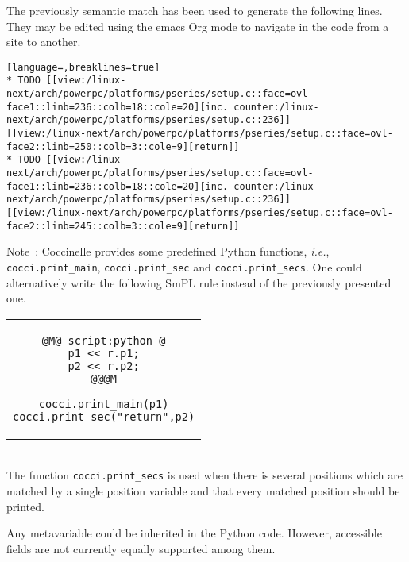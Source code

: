 The previously semantic match has been used to generate the following
lines. They may be edited using the emacs Org mode to navigate in the code
from a site to another.

\begin{lstlisting}[language=,breaklines=true]
* TODO [[view:/linux-next/arch/powerpc/platforms/pseries/setup.c::face=ovl-face1::linb=236::colb=18::cole=20][inc. counter:/linux-next/arch/powerpc/platforms/pseries/setup.c::236]]
[[view:/linux-next/arch/powerpc/platforms/pseries/setup.c::face=ovl-face2::linb=250::colb=3::cole=9][return]]
* TODO [[view:/linux-next/arch/powerpc/platforms/pseries/setup.c::face=ovl-face1::linb=236::colb=18::cole=20][inc. counter:/linux-next/arch/powerpc/platforms/pseries/setup.c::236]]
[[view:/linux-next/arch/powerpc/platforms/pseries/setup.c::face=ovl-face2::linb=245::colb=3::cole=9][return]]
\end{lstlisting}

Note~: Coccinelle provides some predefined Python functions,
\emph{i.e.}, \texttt{cocci.print\_main}, \texttt{cocci.print\_sec} and
\texttt{cocci.print\_secs}. One could alternatively write the following
SmPL rule instead of the previously presented one.

\begin{tabular}{c}
\begin{lstlisting}[language=Cocci]
@M@ script:python @
p1 << r.p1;
p2 << r.p2;
@@@M

cocci.print_main(p1)
cocci.print_sec("return",p2)
\end{lstlisting}
\end{tabular}\\

The function \texttt{cocci.print\_secs} is used when there is several
positions which are matched by a single position variable and that
every matched position should be printed.

Any metavariable could be inherited in the Python code. However,
accessible fields are not currently equally supported among them.


